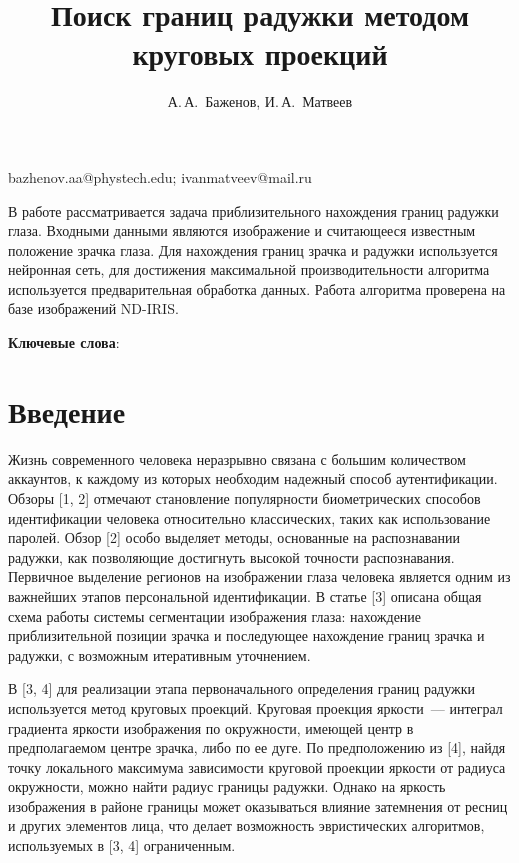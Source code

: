 \documentclass[12pt, twoside]{article}
\begin{document}
\title
    {Поиск границ радужки методом круговых проекций} %
\author
    {А.\,А.~Баженов, И.\,А.~Матвеев} %
\email
    {bazhenov.aa@phystech.edu; ivanmatveev@mail.ru}
\abstract
    {В работе рассматривается задача приблизительного нахождения границ радужки глаза. Входными данными являются изображение и считающееся известным положение зрачка глаза. Для нахождения границ зрачка и радужки используется нейронная сеть, для достижения максимальной производительности алгоритма используется предварительная обработка данных. Работа алгоритма проверена на базе изображений ND-IRIS.
	
\bigskip
\noindent
\textbf{Ключевые слова}: \emph {}

}


\maketitle
\linenumbers

\section{Введение}
Жизнь современного человека неразрывно связана с большим количеством аккаунтов, к каждому из которых необходим надежный способ аутентификации. Обзоры [1, 2] отмечают становление популярности биометрических способов идентификации человека относительно классических, таких как использование паролей. Обзор [2] особо выделяет методы, основанные на распознавании радужки, как позволяющие достигнуть высокой точности распознавания. Первичное выделение регионов на изображении глаза человека является одним из важнейших этапов персональной идентификации. В статье [3] описана общая схема работы системы сегментации изображения глаза: нахождение приблизительной позиции зрачка и последующее нахождение границ зрачка и радужки, с возможным итеративным уточнением.

В [3, 4] для реализации этапа первоначального определения границ радужки  используется метод круговых проекций. Круговая проекция яркости~--- интеграл градиента яркости изображения по окружности, имеющей центр в предполагаемом центре зрачка, либо по ее дуге. По предположению из [4], найдя точку локального максимума зависимости круговой проекции яркости от радиуса окружности, можно найти радиус границы радужки. Однако на яркость изображения в районе границы может оказываться влияние затемнения от ресниц и других элементов лица, что делает возможность эвристических алгоритмов, используемых в [3, 4] ограниченным.
\end{document}
